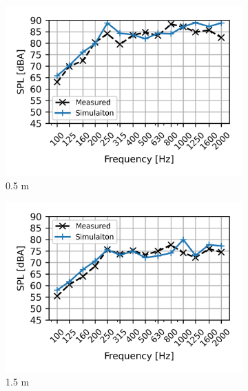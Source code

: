 \begin{figure}[H]
	\centering
	\begin{subfigure}[b]{0.49\textwidth}
		\centering
		\includegraphics{fig/chap5/initial_model/freq_spectrum/pos_10cm_0pt5m.png}
		\caption{0.5 m}
	\end{subfigure}
	\begin{subfigure}[b]{0.49\textwidth}
		\centering
		\includegraphics{fig/chap5/initial_model/freq_spectrum/pos_10cm_1pt5m.png}
		\caption{1.5 m}
	\end{subfigure}
	\begin{subfigure}[b]{0.49\textwidth}
		\centering

\end{subfigure}
\end{figure}
